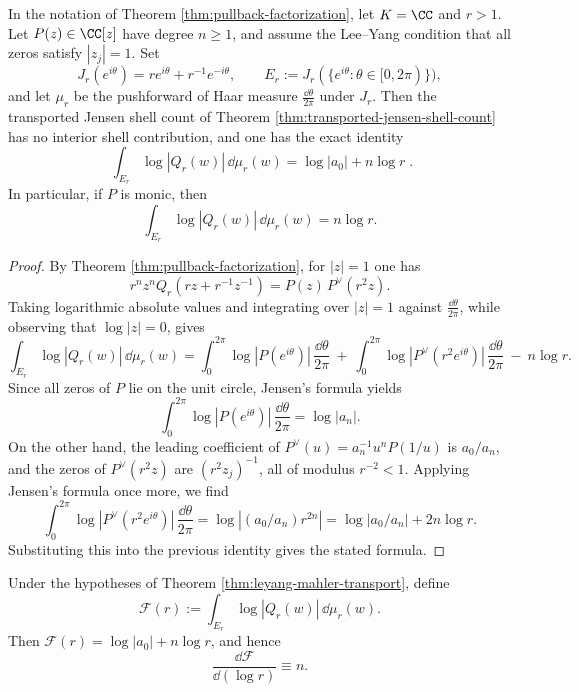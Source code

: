 \begin{theorem}\label{thm:leyang-mahler-transport}
In the notation of Theorem \ref{thm:pullback-factorization}, let \(K=\CC\) and \(r>1\). Let \(P(z)\in\CC[z]\) have degree \(n\ge 1\), and assume the Lee--Yang condition that all zeros satisfy \(|z_j|=1\). Set
\[
J_r(e^{i\theta})=r e^{i\theta}+r^{-1}e^{-i\theta},
\qquad
E_r:=J_r(\{e^{i\theta}:\theta\in[0,2\pi)\}),
\]
and let \(\mu_r\) be the pushforward of Haar measure \(\frac{\dd\theta}{2\pi}\) under \(J_r\). Then the transported Jensen shell count of Theorem \ref{thm:transported-jensen-shell-count} has no interior shell contribution, and one has the exact identity
\[
\boxed{\;
\int_{E_r}\log|Q_r(w)|\,\dd\mu_r(w)=\log|a_0|+n\log r\; }.
\]
In particular, if \(P\) is monic, then
\[
\int_{E_r}\log|Q_r(w)|\,\dd\mu_r(w)=n\log r.
\]
\end{theorem}

\begin{proof}
By Theorem \ref{thm:pullback-factorization}, for \(|z|=1\) one has
\[
r^n z^n Q_r\!\left(r z+r^{-1}z^{-1}\right)=P(z)\,P^{\vee}(r^2 z).
\]
Taking logarithmic absolute values and integrating over \(|z|=1\) against \(\frac{\dd\theta}{2\pi}\), while observing that \(\log|z|=0\), gives
\[
\int_{E_r}\log|Q_r(w)|\,\dd\mu_r(w)
=\int_{0}^{2\pi}\log|P(e^{i\theta})|\,\frac{\dd\theta}{2\pi}
\ +\ \int_{0}^{2\pi}\log|P^{\vee}(r^2 e^{i\theta})|\,\frac{\dd\theta}{2\pi}
\ -\ n\log r.
\]
Since all zeros of \(P\) lie on the unit circle, Jensen's formula yields
\[
\int_{0}^{2\pi}\log|P(e^{i\theta})|\,\frac{\dd\theta}{2\pi}=\log|a_n|.
\]
On the other hand, the leading coefficient of \(P^\vee(u)=a_n^{-1}u^n P(1/u)\) is \(a_0/a_n\), and the zeros of \(P^\vee(r^2 z)\) are \((r^2 z_j)^{-1}\), all of modulus \(r^{-2}<1\).
Applying Jensen's formula once more, we find
\[
\int_{0}^{2\pi}\log|P^{\vee}(r^2 e^{i\theta})|\,\frac{\dd\theta}{2\pi}
=\log|(a_0/a_n) r^{2n}|=\log|a_0/a_n|+2n\log r.
\]
Substituting this into the previous identity gives the stated formula.
\end{proof}

\begin{corollary}\label{cor:leyang-linear-log-response}
Under the hypotheses of Theorem \ref{thm:leyang-mahler-transport}, define
\[
\mathcal F(r):=\int_{E_r}\log|Q_r(w)|\,\dd\mu_r(w).
\]
Then \(\mathcal F(r)=\log|a_0|+n\log r\), and hence
\[
\frac{\dd \mathcal F}{\dd(\log r)}\equiv n.
\]
\end{corollary}

